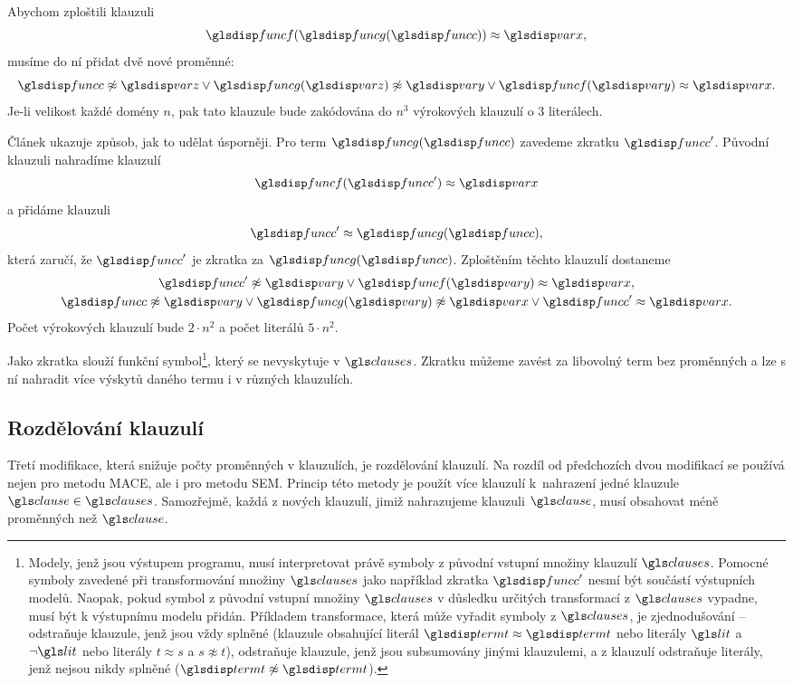 Abychom zploštili klauzuli
\[
  \func(\funcG(\funcC)) \approx \var,
\]
musíme do ní přidat dvě nové proměnné:
\[
  \funcC \not\approx \varZ \vee
    \funcG(\varZ) \not\approx \varY \vee
    \func(\varY) \approx \var.
\]
Je-li velikost každé domény $n$, pak tato klauzule bude
zakódována do $n^3$ vý\-ro\-ko\-vých klauzulí o 3 literálech.

Článek \cite{claessen03paradox} ukazuje způsob, jak to udělat
úsporněji. Pro term $\funcG(\funcC)$ zavedeme zkratku $\funcC'$.
Původní klauzuli nahradíme klauzulí
\[
  \func(\funcC') \approx \var
\]
a přidáme klauzuli
\[
  \funcC' \approx \funcG(\funcC),
\]
která zaručí, že $\funcC'$ je zkratka za $\funcG(\funcC)$.
Zploštěním těchto klauzulí dostaneme
\begin{gather*}
  \funcC' \not\approx \varY \vee \func(\varY) \approx \var, \\
  \funcC \not\approx \varY \vee
    \funcG(\varY) \not\approx \var \vee
    \funcC' \approx \var.
\end{gather*}
Počet výrokových klauzulí bude $2 \cdot n^2$ a počet literálů
$5 \cdot n^2$.

Jako zkratka slouží funkční symbol\footnote{Modely, jenž jsou
výstupem programu, musí interpretovat právě symboly z původní vstupní množiny
klauzulí $\clauses$. Pomocné symboly zavedené
při transformování množiny $\clauses$ jako například zkratka $\funcC'$
nesmí být součástí výstupních modelů. Naopak, pokud symbol
z původní vstupní množiny $\clauses$ v důsledku určitých transformací
z $\clauses$ vypadne, musí být k výstupnímu modelu přidán.
Příkladem transformace, která může vyřadit symboly z $\clauses$,
je zjednodušování -- odstraňuje klauzule, jenž jsou vždy splněné
(klauzule obsahující literál $\term \approx \term$ nebo literály
$\lit$ a $\neg \lit$ nebo literály $t \approx s$
a $s \not\approx t$), odstraňuje klauzule, jenž
jsou subsumovány jinými klauzulemi,
a z klauzulí odstraňuje literály, jenž nejsou nikdy splněné
($\term \not\approx \term$).},
který se nevyskytuje v $\clauses$.
Zkratku můžeme zavést za libovolný term bez proměnných
a lze s ní nahradit více výskytů daného termu i v různých klauzulích.

\subsection{Rozdělování klauzulí}

Třetí modifikace, která snižuje počty proměnných v klauzulích,
je rozdělování klauzulí. Na rozdíl od předchozích dvou modifikací
se používá nejen pro metodu MACE, ale i pro metodu SEM.
Princip této metody je použít více klauzulí k~nahrazení jedné
klauzule $\clause \in \clauses$.
Samozřejmě, každá z nových klauzulí, jimiž nahrazujeme klauzuli $\clause$,
musí obsahovat méně proměnných než $\clause$.

